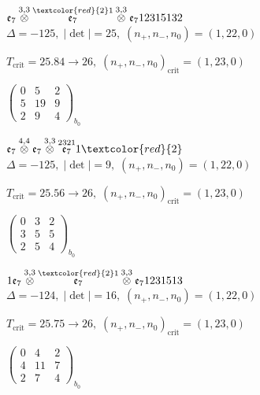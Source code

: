 \documentclass[10pt]{article}
\begin{document}
\smallskip

$\mathfrak{e}_7\overset{3,3}{\otimes}\overset{\textcolor{red}{2}1}{\mathfrak{e}_7}\overset{3,3}{\otimes}\mathfrak{e}_712315132$ \quad $\Delta=-125,\; |\det|=25,\; (n_+,n_-,n_0)=(1,22,0)$

\hspace{1em}$T_{\text{crit}}=25.84 \to 26,\; (n_+,n_-,n_0)_{\text{crit}}=(1,23,0)$

\hspace{2em}$\left(\begin{smallmatrix}0 & 5 & 2 \\ 5 & 19 & 9 \\ 2 & 9 & 4\end{smallmatrix}\right)_{\!b_0}$

\smallskip

$\mathfrak{e}_7\overset{4,4}{\otimes}\mathfrak{e}_7\overset{3,3}{\otimes}\overset{2321}{\mathfrak{e}_7}1\textcolor{red}{2}$ \quad $\Delta=-125,\; |\det|=9,\; (n_+,n_-,n_0)=(1,22,0)$

\hspace{1em}$T_{\text{crit}}=25.56 \to 26,\; (n_+,n_-,n_0)_{\text{crit}}=(1,23,0)$

\hspace{2em}$\left(\begin{smallmatrix}0 & 3 & 2 \\ 3 & 5 & 5 \\ 2 & 5 & 4\end{smallmatrix}\right)_{\!b_0}$

\smallskip

$1\mathfrak{e}_7\overset{3,3}{\otimes}\overset{\textcolor{red}{2}1}{\mathfrak{e}_7}\overset{3,3}{\otimes}\mathfrak{e}_71231513$ \quad $\Delta=-124,\; |\det|=16,\; (n_+,n_-,n_0)=(1,22,0)$

\hspace{1em}$T_{\text{crit}}=25.75 \to 26,\; (n_+,n_-,n_0)_{\text{crit}}=(1,23,0)$

\hspace{2em}$\left(\begin{smallmatrix}0 & 4 & 2 \\ 4 & 11 & 7 \\ 2 & 7 & 4\end{smallmatrix}\right)_{\!b_0}$
\end{document}
